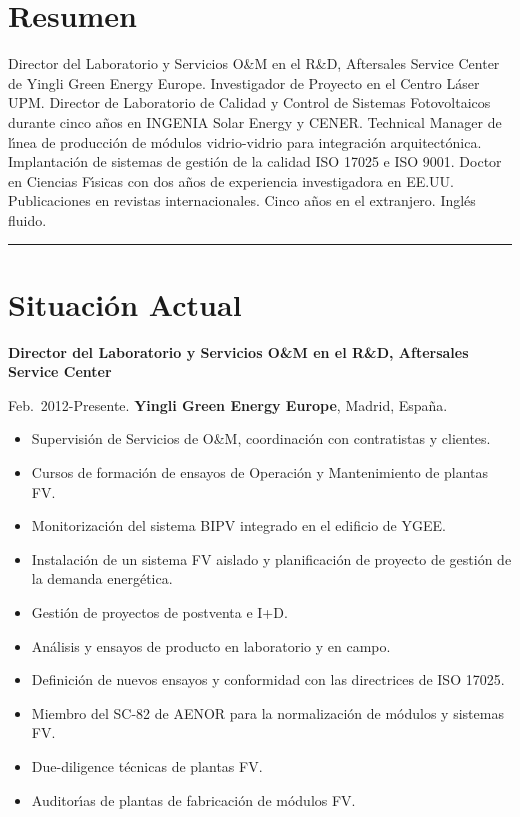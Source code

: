 \documentclass{article}
\begin{document}



\section*{Resumen}

Director del Laboratorio y Servicios O{\&}M en el R{\&}D, Aftersales Service Center de Yingli Green Energy Europe.  Investigador de Proyecto en el Centro L\'aser UPM. Director de Laboratorio de Calidad y Control de Sistemas Fotovoltaicos durante cinco a\~nos en INGENIA Solar Energy y CENER. Technical Manager de l\'{\i}nea de producci\'on de m\'odulos vidrio-vidrio para integraci\'on arquitect\'onica. Implantaci\'on de sistemas de gesti\'on de la calidad ISO 17025 e ISO 9001. Doctor en Ciencias F\'{\i}sicas con dos a\~nos de experiencia investigadora en EE.UU. Publicaciones en revistas internacionales. Cinco a\~nos en el extranjero. Ingl\'es fluido.

\bigskip

\hrule


\section*{Situaci\'on Actual}

{\bf Director del Laboratorio y Servicios O{\&}M en el R{\&}D, Aftersales Service Center}

\medskip
Feb.~2012-Presente.
{\bf Yingli Green Energy Europe},
Madrid, Espa\~na.

\begin{itemize}\itemsep 0pt
\item Supervisi\'on de Servicios de O{\&}M, coordinaci\'on con contratistas y clientes.
\item Cursos de formaci\'on de ensayos de Operaci\'on y Mantenimiento de plantas FV.
\item Monitorizaci\'on del sistema BIPV integrado en el edificio de YGEE. 
\item Instalaci\'on de un sistema FV aislado y planificaci\'on de proyecto de gesti\'on de la demanda energ\'etica.
\item Gesti\'on de proyectos de postventa e I+D.
\item An\'alisis y ensayos de producto en laboratorio y en campo.
\item Definici\'on de nuevos ensayos y conformidad con las directrices de ISO 17025.
\item Miembro del SC-82 de AENOR para la normalizaci\'on de m\'odulos y sistemas FV.
\item Due-diligence t\'ecnicas de plantas FV.
\item Auditor\'{\i}as de plantas de fabricaci\'on de m\'odulos FV.
\end{itemize}
\end{document}
